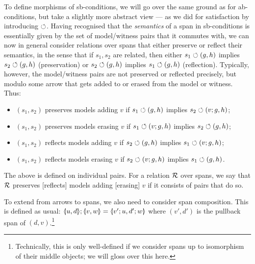 To define morphisms of sb-conditions, we will go over the same ground as for ab-conditions, but take a slightly more abstract view --- as we did for satisfaction by introducing $\circlearrowleft$. Having recognised that the \emph{semantics} of a span in sb-conditions is essentially given by the set of model/witness pairs that it commutes with, we can now in general consider relations over spans that either preserve or reflect their semantics, in the sense that if $s_1,s_2$ are related, then either $s_1\circlearrowleft (g,h)$ implies $s_2\circlearrowleft (g,h)$ (preservation) or $s_2\circlearrowleft (g,h)$ implies $s_1\circlearrowleft (g,h)$ (reflection). Typically, however, the model/witness pairs are not preserved or reflected precisely, but modulo some arrow that gets added to or erased from the model or witness. Thus:
%
\begin{itemize}
\item $(s_1,s_2)$ preserves models adding $v$ if $s_1\circlearrowleft (g,h)$ implies $s_2\circlearrowleft (v;g,h)$;
\item $(s_1,s_2)$ preserves models erasing $v$ if $s_1\circlearrowleft (v;g,h)$ implies $s_2\circlearrowleft (g,h)$;
\item $(s_1,s_2)$ reflects models adding $v$ if $s_2\circlearrowleft (g,h)$ implies $s_1\circlearrowleft (v;g,h)$;
\item $(s_1,s_2)$ reflects models erasing $v$ if $s_2\circlearrowleft (v;g,h)$ implies $s_1\circlearrowleft (g,h)$.
\end{itemize}
%
The above is defined on individual pairs. For a relation $\mathcal{R}$ over spans, we say that $\mathcal{R}$ preserves [reflects] models adding [erasing] $v$ if it consists of pairs that do so.

To extend  from arrows to spans, we also need to consider span composition. This is defined as usual: $\spanof u d;\spanof v w=\spanof{v';u}{d';w}$ where $(v',d')$ is the pullback span of $(d,v)$.\footnote{Technically, this is only well-defined if we consider spans up to isomorphism of their middle objects; we will gloss over this here.} 


